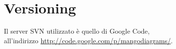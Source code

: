 \section{Versioning}
Il server SVN utilizzato è quello di Google Code, \\all'indirizzo \href{http://code.google.com/p/mangodiagrams/}{http://code.google.com/p/mangodiagrams/}.
